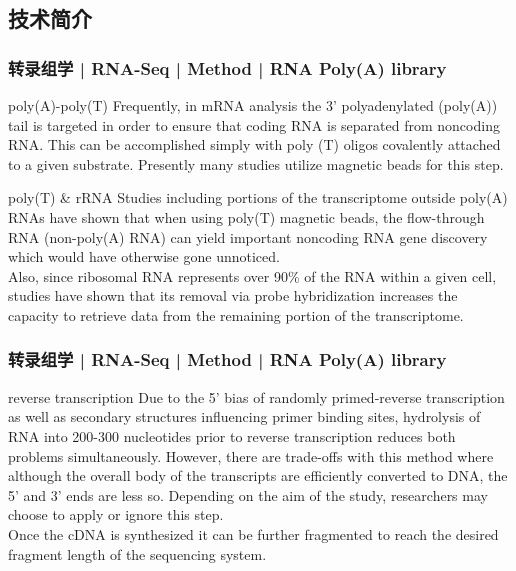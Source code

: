 \subsection{技术简介}
\begin{frame}
  \frametitle{转录组学 | RNA-Seq | Method | RNA Poly(A) library}
  \begin{block}{poly(A)-poly(T)}
    Frequently, in mRNA analysis the 3' polyadenylated (poly(A)) tail is targeted in order to ensure that coding RNA is separated from noncoding RNA. This can be accomplished simply with poly (T) oligos covalently attached to a given substrate. Presently many studies utilize magnetic beads for this step.
  \end{block}
  \pause
  \begin{block}{poly(T) \& rRNA}
    Studies including portions of the transcriptome outside poly(A) RNAs have shown that when using poly(T) magnetic beads, the flow-through RNA (non-poly(A) RNA) can yield important noncoding RNA gene discovery which would have otherwise gone unnoticed.\\
    \vspace{0.2em}
    Also, since ribosomal RNA represents over 90\% of the RNA within a given cell, studies have shown that its removal via probe hybridization increases the capacity to retrieve data from the remaining portion of the transcriptome.
  \end{block}
\end{frame}

\begin{frame}
  \frametitle{转录组学 | RNA-Seq | Method | RNA Poly(A) library}
  \begin{block}{reverse transcription}
 Due to the 5' bias of randomly primed-reverse transcription as well as secondary structures influencing primer binding sites, hydrolysis of RNA into 200-300 nucleotides prior to reverse transcription reduces both problems simultaneously. However, there are trade-offs with this method where although the overall body of the transcripts are efficiently converted to DNA, the 5' and 3' ends are less so. Depending on the aim of the study, researchers may choose to apply or ignore this step.\\
 \vspace{1em}
    Once the cDNA is synthesized it can be further fragmented to reach the desired fragment length of the sequencing system.
  \end{block}
\end{frame}

